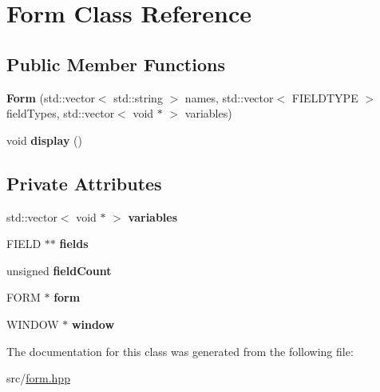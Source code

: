 \hypertarget{class_form}{\section{Form Class Reference}
\label{class_form}
}
\subsection*{Public Member Functions}
\begin{DoxyCompactItemize}
\item 
\hypertarget{class_form_ad58a9d6120398d59cdd35697b1aede9a}{{\bfseries Form} (std\-::vector$<$ std\-::string $>$ names, std\-::vector$<$ F\-I\-E\-L\-D\-T\-Y\-P\-E $>$ field\-Types, std\-::vector$<$ void $\ast$ $>$ variables)}\label{class_form_ad58a9d6120398d59cdd35697b1aede9a}

\item 
\hypertarget{class_form_a6abc853f0eaebfe9d254a4267d507afc}{void {\bfseries display} ()}\label{class_form_a6abc853f0eaebfe9d254a4267d507afc}

\end{DoxyCompactItemize}
\subsection*{Private Attributes}
\begin{DoxyCompactItemize}
\item 
\hypertarget{class_form_a67f99a7525a5e869b1431618a6283969}{std\-::vector$<$ void $\ast$ $>$ {\bfseries variables}}\label{class_form_a67f99a7525a5e869b1431618a6283969}

\item 
\hypertarget{class_form_abbdafa71c681bcd5b58d8ea9ed65cd8d}{F\-I\-E\-L\-D $\ast$$\ast$ {\bfseries fields}}\label{class_form_abbdafa71c681bcd5b58d8ea9ed65cd8d}

\item 
\hypertarget{class_form_a92c8e7f4946f63262fc7569320263555}{unsigned {\bfseries field\-Count}}\label{class_form_a92c8e7f4946f63262fc7569320263555}

\item 
\hypertarget{class_form_afdaa59a5541e19e9dc15b60cfb68933d}{F\-O\-R\-M $\ast$ {\bfseries form}}\label{class_form_afdaa59a5541e19e9dc15b60cfb68933d}

\item 
\hypertarget{class_form_a7fae39d4064f1f4d34c7e0ff1f6e3525}{W\-I\-N\-D\-O\-W $\ast$ {\bfseries window}}\label{class_form_a7fae39d4064f1f4d34c7e0ff1f6e3525}

\end{DoxyCompactItemize}


The documentation for this class was generated from the following file\-:\begin{DoxyCompactItemize}
\item 
src/\hyperlink{form_8hpp}{form.\-hpp}\end{DoxyCompactItemize}
